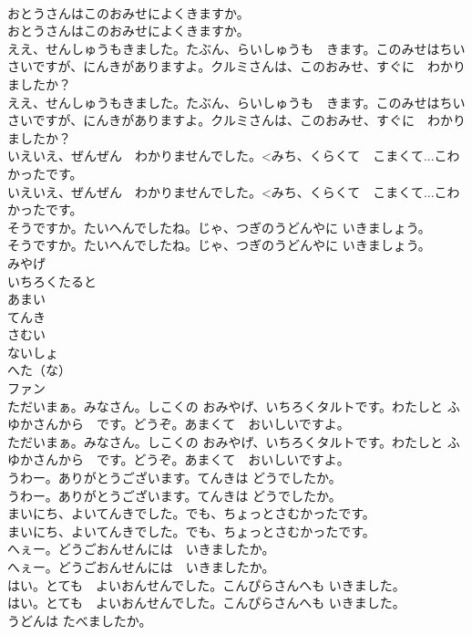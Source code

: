\documentclass[8pt]{extreport}
\begin{document}
\begin{CJK}{UTF8}{min}
\\	おとうさんはこのおみせによくきますか。	
\\	おとうさんはこのおみせによくきますか。 
\\	ええ、せんしゅうもきました。たぶん、らいしゅうも　きます。このみせはちいさいですが、にんきがありますよ。クルミさんは、このおみせ、すぐに　わかりましたか？	
\\	ええ、せんしゅうもきました。たぶん、らいしゅうも　きます。このみせはちいさいですが、にんきがありますよ。クルミさんは、このおみせ、すぐに　わかりましたか？ 
\\	いえいえ、ぜんぜん　わかりませんでした。<みち、くらくて　こまくて...こわかったです。	
\\	いえいえ、ぜんぜん　わかりませんでした。<みち、くらくて　こまくて...こわかったです。 
\\	そうですか。たいへんでしたね。じゃ、つぎのうどんやに いきましょう。	
\\	そうですか。たいへんでしたね。じゃ、つぎのうどんやに いきましょう。 
\\	みやげ
\\	いちろくたると
\\	あまい
\\	てんき
\\	さむい
\\	ないしょ
\\	へた（な）
\\	ファン
\\	ただいまぁ。みなさん。しこくの おみやげ、いちろくタルトです。わたしと ふゆかさんから　です。どうぞ。あまくて　おいしいですよ。	
\\	ただいまぁ。みなさん。しこくの おみやげ、いちろくタルトです。わたしと ふゆかさんから　です。どうぞ。あまくて　おいしいですよ。 
\\	うわー。ありがとうございます。てんきは どうでしたか。	
\\	うわー。ありがとうございます。てんきは どうでしたか。 
\\	まいにち、よいてんきでした。でも、ちょっとさむかったです。	
\\	まいにち、よいてんきでした。でも、ちょっとさむかったです。 
\\	へぇー。どうごおんせんには　いきましたか。	
\\	へぇー。どうごおんせんには　いきましたか。 
\\	はい。とても　よいおんせんでした。こんぴらさんへも いきました。	
\\	はい。とても　よいおんせんでした。こんぴらさんへも いきました。 
\\	うどんは たべましたか。	

\end{CJK}
\end{document}
